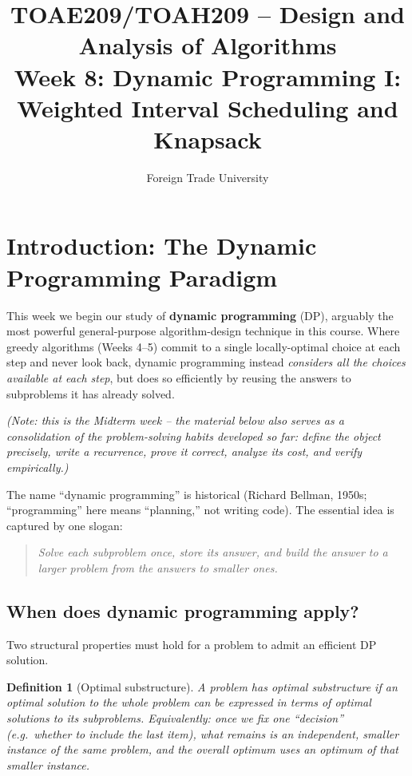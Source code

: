 \documentclass[11pt]{article}
\title{TOAE209/TOAH209 -- Design and Analysis of Algorithms\\[4pt]
\large Week 8: Dynamic Programming I: Weighted Interval Scheduling and Knapsack}
\author{Foreign Trade University}
\date{}
\newtheorem{definition}[theorem]{Definition}
\begin{document}
\maketitle
\tableofcontents

\section{Introduction: The Dynamic Programming Paradigm}

This week we begin our study of \textbf{dynamic programming} (DP), arguably the most
powerful general-purpose algorithm-design technique in this course. Where greedy
algorithms (Weeks 4--5) commit to a single locally-optimal choice at each step and never
look back, dynamic programming instead \emph{considers all the choices available at each
step}, but does so efficiently by reusing the answers to subproblems it has already
solved.

\medskip
\noindent\textit{(Note: this is the Midterm week -- the material below also serves as a
consolidation of the problem-solving habits developed so far: define the object precisely,
write a recurrence, prove it correct, analyze its cost, and verify empirically.)}

The name ``dynamic programming'' is historical (Richard Bellman, 1950s; ``programming''
here means ``planning,'' not writing code). The essential idea is captured by one slogan:

\begin{quote}
\emph{Solve each subproblem once, store its answer, and build the answer to a larger
problem from the answers to smaller ones.}
\end{quote}

\subsection{When does dynamic programming apply?}

Two structural properties must hold for a problem to admit an efficient DP solution.

\begin{definition}[Optimal substructure]
A problem has \emph{optimal substructure} if an optimal solution to the whole problem can
be expressed in terms of optimal solutions to its subproblems. Equivalently: once we fix
one ``decision'' (e.g.\ whether to include the last item), what remains is an independent,
smaller instance of the same problem, and the overall optimum uses an optimum of that
smaller instance.
\end{definition}
\end{document}
